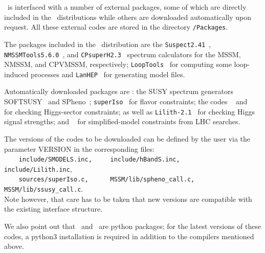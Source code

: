 \documentclass[12pt,a4paper]{article}
\begin{document}
\micro\ is interfaced with a number of external packages, some of which are directly included in the \micro\ distributions  while others are downloaded automatically upon request. All these external codes are stored in the directory {\tt /Packages}.
 
The packages included in the \micro\ distribution are 
the {\tt Suspect2.41}~\cite{Djouadi:2002ze},  {\tt NMSSMTools5.6.0}~\cite{nmssmtools,Ellwanger:2005dv}, and {\tt CPsuperH2.3}~\cite{CPSUPERH,Lee:2003nta} spectrum calculators for the 
MSSM, NMSSM, and CPVMSSM, respectively; {\tt LoopTools}~\cite{Hahn:1998yk} for computing some loop-induced processes 
and {\tt LanHEP}~\cite{Semenov:2014rea} for generating model files. 

 
Automatically downloaded packages are : 
the SUSY spectrum generators SOFTSUSY~\cite{Allanach:2001kg} and SPheno~\cite{Porod:2011nf}; 
{\tt superIso}~\cite{Mahmoudi:2008tp} for flavor constraints; 
the codes \HB~\cite{Bechtle:2013wla,Bechtle:2020pkv} and \HS~\cite{Bechtle:2013xfa,Bechtle:2020uwn} for checking Higgs-sector constraints; 
as well as 
 {\tt Lilith-2.1}~\cite{Bernon:2015hsa,Kraml:2019sis,Bertrand:2020lyb} for checking Higgs signal strengths;
and 
\smodels~\cite{Kraml:2013mwa,Ambrogi:2017neo,Ambrogi:2018ujg,smodels20} for simplified-model constraints from LHC searches. 
 
The versions of the codes to be downloaded can be defined by the user  via the parameter
VERSION  in the corresponding files:\\[2mm]
 \verb|    include/SMODELS.inc,     include/hBandS.inc,     include/Lilith.inc|,\\
 \verb|    sources/superIso.c,      MSSM/lib/spheno_call.c,  MSSM/lib/ssusy_call.c|.\\[2mm]
Note however, that care has to be taken that new versions are compatible with the existing interface structure.

We also point out that \lilith\ and \smodels\ are python packages; for the latest versions of these codes, a
python3 installation is required in addition to the compilers mentioned above.

\end{document}
